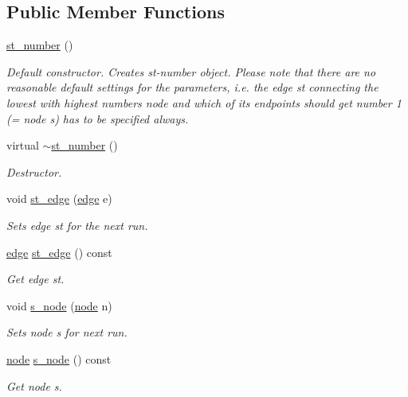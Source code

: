\subsection*{Public Member Functions}
\begin{DoxyCompactItemize}
\item 
\mbox{\hyperlink{classst__number_a07532323fbcc643dfc419809385b64a7}{st\+\_\+number}} ()
\begin{DoxyCompactList}\small\item\em Default constructor. Creates st-\/number object. Please note that there are no reasonable default settings for the parameters, i.\+e. the edge  st connecting the lowest with highest numbers node and which of its endpoints should get number 1 (= node {\itshape s}) has to be specified always. \end{DoxyCompactList}\item 
virtual \mbox{\hyperlink{classst__number_a4f3a2a6ceab39d106c920ee3546c259d}{$\sim$st\+\_\+number}} ()
\begin{DoxyCompactList}\small\item\em Destructor. \end{DoxyCompactList}\item 
void \mbox{\hyperlink{classst__number_a1564af6f603160105643f22bf2f6955b}{st\+\_\+edge}} (\mbox{\hyperlink{classedge}{edge}} e)
\begin{DoxyCompactList}\small\item\em Sets edge {\itshape st} for the next run. \end{DoxyCompactList}\item 
\mbox{\hyperlink{classedge}{edge}} \mbox{\hyperlink{classst__number_a8938bab7883ff4194d1a7b4c6d8fb471}{st\+\_\+edge}} () const
\begin{DoxyCompactList}\small\item\em Get edge {\itshape st}. \end{DoxyCompactList}\item 
void \mbox{\hyperlink{classst__number_aa607c9aaa5a4d9c45e5854ce672f0fda}{s\+\_\+node}} (\mbox{\hyperlink{classnode}{node}} n)
\begin{DoxyCompactList}\small\item\em Sets node {\itshape s} for next run. \end{DoxyCompactList}\item 
\mbox{\hyperlink{classnode}{node}} \mbox{\hyperlink{classst__number_aba061fba83eb63b7a23dd685e1db663c}{s\+\_\+node}} () const
\begin{DoxyCompactList}\small\item\em Get node {\itshape s}. \end{DoxyCompactList}\item 

\end{DoxyCompactItemize}
